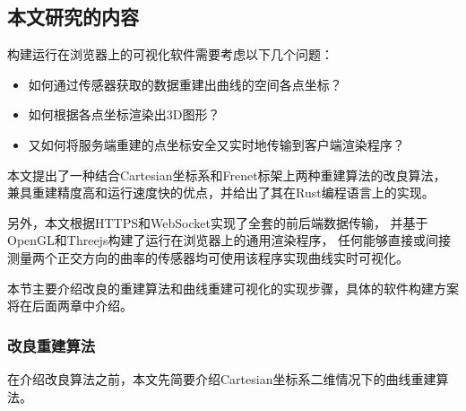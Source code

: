 \subsection{本文研究的内容}

构建运行在浏览器上的可视化软件需要考虑以下几个问题：

\begin{itemize}
\item 如何通过传感器获取的数据重建出曲线的空间各点坐标？
\item 如何根据各点坐标渲染出3D图形？
\item 又如何将服务端重建的点坐标安全又实时地传输到客户端渲染程序？
\end{itemize}

本文提出了一种结合Cartesian坐标系和Frenet标架上两种重建算法的改良算法，
兼具重建精度高和运行速度快的优点，并给出了其在Rust编程语言\cite{rust}上的实现。

另外，本文根据HTTPS和WebSocket实现了全套的前后端数据传输，
并基于OpenGL和Threejs构建了运行在浏览器上的通用渲染程序，
任何能够直接或间接测量两个正交方向的曲率的传感器均可使用该程序实现曲线实时可视化。

本节主要介绍改良的重建算法和曲线重建可视化的实现步骤，具体的软件构建方案将在后面两章中介绍。

\subsubsection{改良重建算法}

在介绍改良算法之前，本文先简要介绍Cartesian坐标系二维情况下的曲线重建算法。

